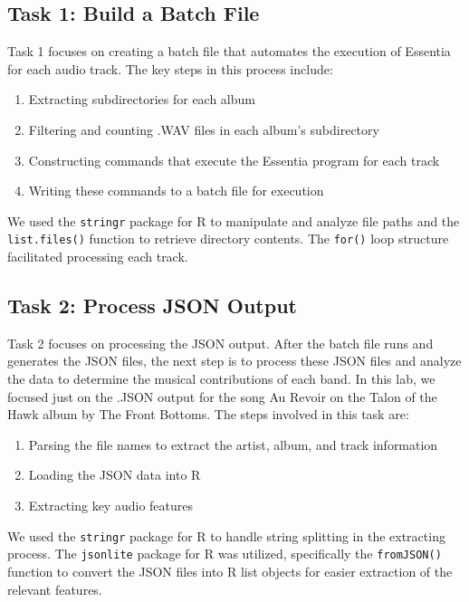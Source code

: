 \documentclass{article}\usepackage[]{graphicx}\usepackage[]{xcolor}
\begin{document}
\begin{multicols}{2}
\subsection{Task 1: Build a Batch File}
Task 1 focuses on creating a batch file that automates the execution of Essentia for each audio track. The key steps in this process include:

\begin{enumerate} 
  \item Extracting subdirectories for each album
  \item Filtering and counting .WAV files in each album's subdirectory
  \item Constructing commands that execute the Essentia program for each track
  \item Writing these commands to a batch file for execution
\end{enumerate}

We used the \texttt{stringr} package for R \citep{stringr} to manipulate and analyze file paths and the \texttt{list.files()} function to retrieve directory contents. The \texttt{for()} loop structure facilitated processing each track.

\subsection{Task 2: Process JSON Output}
Task 2 focuses on processing the JSON output. After the batch file runs and generates the JSON files, the next step is to process these JSON files and analyze the data to determine the musical contributions of each band. In this lab, we focused just on the .JSON output for the song Au Revoir on the Talon of the Hawk album by The Front Bottoms. The steps involved in this task are:

\begin{enumerate} 
  \item Parsing the file names to extract the artist, album, and track information 
  \item Loading the JSON data into R
  \item Extracting key audio features
\end{enumerate}

We used the \texttt{stringr} package for R \citep{stringr} to handle string splitting in the extracting process. The \texttt{jsonlite} package for R \citep{jsonlite} was utilized, specifically the \texttt{fromJSON()} function to convert the JSON files into R list objects for easier extraction of the relevant features. 


\end{multicols}
\end{document}
